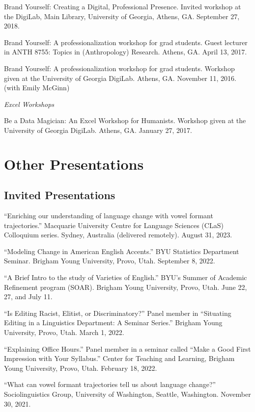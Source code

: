 \documentclass[
]{article}
\begin{document}
Brand Yourself: Creating a Digital, Professional Presence. Invited
workshop at the DigiLab, Main Library, University of Georgia, Athens,
GA. September 27, 2018.

Brand Yourself: A professionalization workshop for grad students. Guest
lecturer in ANTH 8755: Topics in (Anthropology) Research. Athens, GA.
April 13, 2017.

Brand Yourself: A professionalization workshop for grad students.
Workshop given at the University of Georgia DigiLab. Athens, GA.
November 11, 2016. (with Emily McGinn)

\emph{Excel Workshops}

Be a Data Magician: An Excel Workshop for Humanists. Workshop given at
the University of Georgia DigiLab. Athens, GA. January 27, 2017.

\hypertarget{other-presentations}{%
\section{Other Presentations}\label{other-presentations}}

\hypertarget{invited-presentations}{%
\subsection{Invited Presentations}\label{invited-presentations}}

``Enriching our understanding of language change with vowel formant
trajectories.'' Macquarie University Centre for Language Sciences (CLaS)
Colloquium series. Sydney, Australia (delivered remotely). August 31,
2023.

``Modeling Change in American English Accents.'' BYU Statistics
Department Seminar. Brigham Young University, Provo, Utah. September 8,
2022.

``A Brief Intro to the study of Varieties of English.'' BYU's Summer of
Academic Refinement program (SOAR). Brigham Young University, Provo,
Utah. June 22, 27, and July 11.

``Is Editing Racist, Elitist, or Discriminatory?'' Panel member in
``Situating Editing in a Linguistics Department: A Seminar Series.''
Brigham Young University, Provo, Utah. March 1, 2022.

``Explaining Office Hours.'' Panel member in a seminar called ``Make a
Good First Impression with Your Syllabus.'' Center for Teaching and
Learning, Brigham Young University, Provo, Utah. February 18, 2022.

``What can vowel formant trajectories tell us about language change?''
Sociolinguistics Group, University of Washington, Seattle, Washington.
November 30, 2021.
\end{document}
